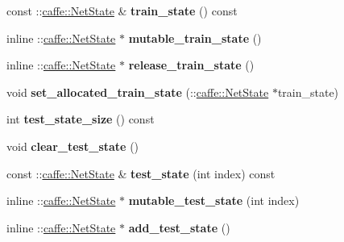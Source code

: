 \begin{DoxyCompactItemize}
const \+::\mbox{\hyperlink{classcaffe_1_1_net_state}{caffe\+::\+Net\+State}} \& {\bfseries train\+\_\+state} () const
\item 
\mbox{\label{classcaffe_1_1_solver_parameter_a5e7bfe4756a0d0607c41b3ee4fd7895c}} 
inline \+::\mbox{\hyperlink{classcaffe_1_1_net_state}{caffe\+::\+Net\+State}} $\ast$ {\bfseries mutable\+\_\+train\+\_\+state} ()
\item 
\mbox{\label{classcaffe_1_1_solver_parameter_a6b92f8d53a8c8ba8e8cd039ed9d18f4b}} 
inline \+::\mbox{\hyperlink{classcaffe_1_1_net_state}{caffe\+::\+Net\+State}} $\ast$ {\bfseries release\+\_\+train\+\_\+state} ()
\item 
\mbox{\label{classcaffe_1_1_solver_parameter_a8e6a105a8f9bc2c430425a645ca45a3e}} 
void {\bfseries set\+\_\+allocated\+\_\+train\+\_\+state} (\+::\mbox{\hyperlink{classcaffe_1_1_net_state}{caffe\+::\+Net\+State}} $\ast$train\+\_\+state)
\item 
\mbox{\label{classcaffe_1_1_solver_parameter_a7f2ea623f0db2b50fc4c6008297529fc}} 
int {\bfseries test\+\_\+state\+\_\+size} () const
\item 
\mbox{\label{classcaffe_1_1_solver_parameter_aa65a8971ad414f35472844b1a6d6895c}} 
void {\bfseries clear\+\_\+test\+\_\+state} ()
\item 
\mbox{\label{classcaffe_1_1_solver_parameter_a47797e82243f0887e4b6bec4dc969bab}} 
const \+::\mbox{\hyperlink{classcaffe_1_1_net_state}{caffe\+::\+Net\+State}} \& {\bfseries test\+\_\+state} (int index) const
\item 
\mbox{\label{classcaffe_1_1_solver_parameter_ac3df8b1d7fb64e75f05501714a1a6afa}} 
inline \+::\mbox{\hyperlink{classcaffe_1_1_net_state}{caffe\+::\+Net\+State}} $\ast$ {\bfseries mutable\+\_\+test\+\_\+state} (int index)
\item 
\mbox{\label{classcaffe_1_1_solver_parameter_a8057fd3835ff46e1c8bb5665c9bc07bf}} 
inline \+::\mbox{\hyperlink{classcaffe_1_1_net_state}{caffe\+::\+Net\+State}} $\ast$ {\bfseries add\+\_\+test\+\_\+state} ()

\end{DoxyCompactItemize}
